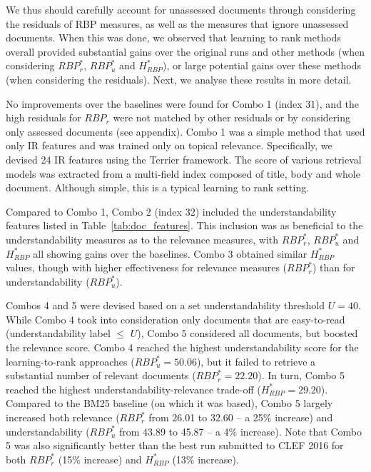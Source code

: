 We thus should carefully account for unassessed documents through considering the residuals of RBP measures, as well as the measures that ignore unassessed documents. When this was done, we observed that learning to rank methods overall provided substantial gains over the original runs and other methods (when considering $RBP^*_r$, $RBP^*_u$ and $H_{RBP}^*$), or large potential gains over these methods (when considering the residuals). Next, we analyse these results in more detail. 

No improvements over the baselines were found for Combo 1 (index 31), and the high residuals for $RBP_r$ were not matched by other residuals or by considering only assessed documents (see appendix). Combo 1 was a simple method that used only IR features and was trained only on topical relevance. Specifically, we devised 24 IR features using the Terrier framework. The score of various retrieval models was extracted from a multi-field index composed of title, body and whole document. Although simple, this is a typical learning to rank setting.

Compared to Combo 1, Combo 2 (index 32) included the understandability features listed in Table~\ref{tab:doc_features}. This inclusion was as beneficial to the understandability measures as to the relevance measures, with $RBP_r^*$, $RBP_u^*$ and $H_{RBP}^*$ all showing gains over the baselines. Combo 3 obtained similar $H_{RBP}^*$ values, though with higher effectiveness for relevance measures ($RBP_r^*$) than for understandability ($RBP_u^*$).

Combos 4 and 5 were devised based on a set understandability threshold $U=40$. While Combo 4 took into consideration only documents that are easy-to-read (understandability label $\le$ $U$), Combo 5 considered all documents, but boosted the relevance score. Combo 4 reached the highest understandability score for the learning-to-rank approaches ($RBP_u^{*}=50.06$), but it failed to retrieve a substantial number of relevant documents ($RBP_r^{*}=22.20$). In turn, Combo 5 reached the highest
understandability-relevance trade-off ($H_{RBP}^{*}=29.20$). Compared to the BM25 baseline (on which it was based), Combo 5  largely increased both relevance ($RBP_r^*$ from 26.01 to 32.60 -- a 25\% increase) and understandability ($RBP_u^*$ from 43.89 to 45.87 -- a 4\% increase). Note that Combo 5 was also significantly better than the best run submitted to CLEF 2016 for both $RBP_r^{*}$ (15\% increase) and $H_{RBP}^{*}$ (13\% increase).


